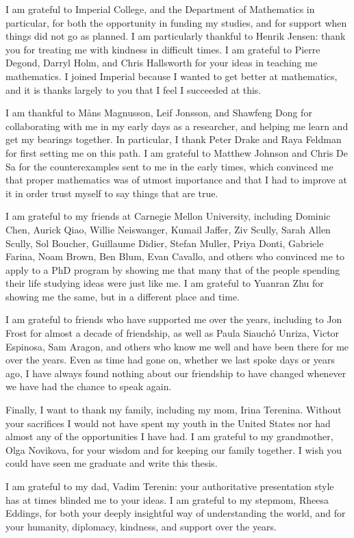\documentclass[11pt]{book}
\begin{document}
I am grateful to Imperial College, and the Department of Mathematics in particular, for both the opportunity in funding my studies, and for support when things did not go as planned.
I am particularly thankful to Henrik Jensen: thank you for treating me with kindness in difficult times.
I am grateful to Pierre Degond, Darryl Holm, and Chris Hallsworth for your ideas in teaching me mathematics. 
I joined Imperial because I wanted to get better at mathematics, and it is thanks largely to you that I feel I succeeded at this.

I am thankful to Måns Magnusson, Leif Jonsson, and Shawfeng Dong for collaborating with me in my early days as a researcher, and helping me learn and get my bearings together.
In particular, I thank Peter Drake and Raya Feldman for first setting me on this path.
I am grateful to Matthew Johnson and Chris De Sa for the counterexamples sent to me in the early times, which convinced me that proper mathematics was of utmost importance and that I had to improve at it in order trust myself to say things that are true.

I am grateful to my friends at Carnegie Mellon University, including Dominic Chen, Aurick Qiao, Willie Neiswanger, Kumail Jaffer, Ziv Scully, Sarah Allen Scully, Sol Boucher, Guillaume Didier, Stefan Muller, Priya Donti, Gabriele Farina, Noam Brown, Ben Blum, Evan Cavallo, and others who convinced me to apply to a PhD program by showing me that many that of the people spending their life studying ideas were just like me.
I am grateful to Yuanran Zhu for showing me the same, but in a different place and time.

I am grateful to friends who have supported me over the years, including to Jon Frost for almost a decade of friendship, as well as Paula Siauchó Unriza, Victor Espinosa, Sam Aragon, and others who know me well and have been there for me over the years.
Even as time had gone on, whether we last spoke days or years ago, I have always found nothing about our friendship to have changed whenever we have had the chance to speak again.

Finally, I want to thank my family, including my mom, Irina Terenina. 
Without your sacrifices I would not have spent my youth in the United States nor had almost any of the opportunities I have had. 
I am grateful to my grandmother, Olga Novikova, for your wisdom and for keeping our family together.
I wish you could have seen me graduate and write this thesis.

I am grateful to my dad, Vadim Terenin: your authoritative presentation style has at times blinded me to your ideas. 
I am grateful to my stepmom, Rheesa Eddings, for both your deeply insightful way of understanding the world, and for your humanity, diplomacy, kindness, and support over the years.
\end{document}
